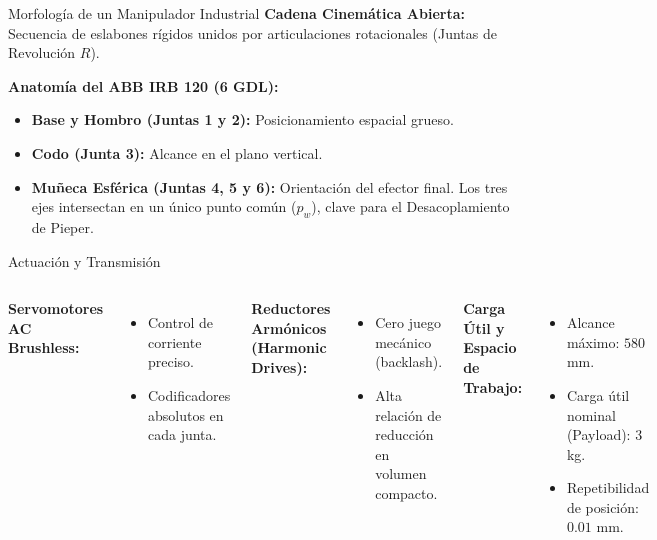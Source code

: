 \documentclass[aspectratio=169]{beamer}
\begin{document}
\begin{frame}{Morfología de un Manipulador Industrial}
    \textbf{Cadena Cinemática Abierta:}
    Secuencia de eslabones rígidos unidos por articulaciones rotacionales (Juntas de Revolución $R$).
    
    \vspace{0.3cm}
    \textbf{Anatomía del ABB IRB 120 (6 GDL):} %
    \begin{itemize}
        \item \textbf{Base y Hombro (Juntas 1 y 2):} Posicionamiento espacial grueso.
        \item \textbf{Codo (Junta 3):} Alcance en el plano vertical.
        \item \textbf{Muñeca Esférica (Juntas 4, 5 y 6):} Orientación del efector final. Los tres ejes intersectan en un único punto común ($p_w$), clave para el Desacoplamiento de Pieper.
    \end{itemize}
\end{frame}

\begin{frame}{Actuación y Transmisión}
    \begin{columns}
        \textbf{Servomotores AC Brushless:}
        \begin{itemize}
            \item Control de corriente preciso.
            \item Codificadores absolutos en cada junta.
        \end{itemize}
        
        \vspace{0.3cm}
        \textbf{Reductores Armónicos (Harmonic Drives):}
        \begin{itemize}
            \item Cero juego mecánico (backlash).
            \item Alta relación de reducción en volumen compacto.
        \end{itemize}
        
        \textbf{Carga Útil y Espacio de Trabajo:}
        \begin{itemize}
            \item Alcance máximo: $580$ mm.
            \item Carga útil nominal (Payload): $3$ kg.
            \item Repetibilidad de posición: $0.01$ mm.
        \end{itemize}
    \end{columns}
\end{frame}
\end{document}
